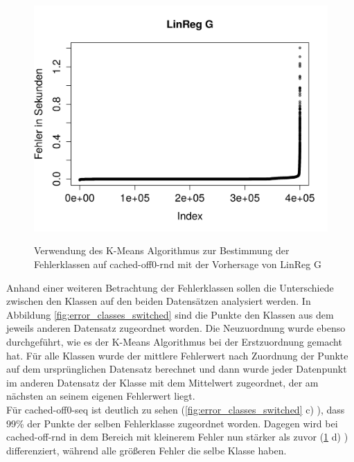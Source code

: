\documentclass[
	12pt,
	a4paper,
	BCOR10mm,
	DIV14,
	listof=totoc,
	bibliography=totoc,
	headsepline
]{scrreprt}
\begin{document}
\begin{figure}
{		\includegraphics[width=.43\textwidth]{Bilder/Plots/error_class/exploration/linreg_error_sorted_rnd.png}
	} 	
	\\
	\caption{Verwendung des K-Means Algorithmus zur Bestimmung der Fehlerklassen auf cached-off0-rnd mit der Vorhersage von \glqq LinReg G\grqq}
	\label{fig:error_class_clustering_rnd}
\end{figure} 

Anhand einer weiteren Betrachtung der Fehlerklassen sollen die Unterschiede zwischen den Klassen auf den beiden Datensätzen analysiert werden.
In Abbildung \ref{fig:error_classes_switched} sind die Punkte den Klassen aus dem jeweils anderen Datensatz zugeordnet worden. Die Neuzuordnung wurde ebenso durchgeführt, wie es der K-Means Algorithmus bei der Erstzuordnung gemacht hat. Für alle Klassen wurde der mittlere Fehlerwert nach Zuordnung der Punkte auf dem ursprünglichen Datensatz berechnet und dann wurde jeder Datenpunkt im anderen Datensatz der Klasse mit dem Mittelwert zugeordnet, der am nächsten an seinem eigenen Fehlerwert liegt.\\ 
Für cached-off0-seq ist deutlich zu sehen (\ref{fig:error_classes_switched} c) ), dass 99\% der Punkte der selben Fehlerklasse zugeordnet worden. Dagegen wird bei cached-off-rnd in dem Bereich mit kleinerem Fehler nun stärker als zuvor (\ref{fig:error_class_clustering_rnd} d) ) differenziert, während alle größeren Fehler die selbe Klasse haben.
\end{document}
